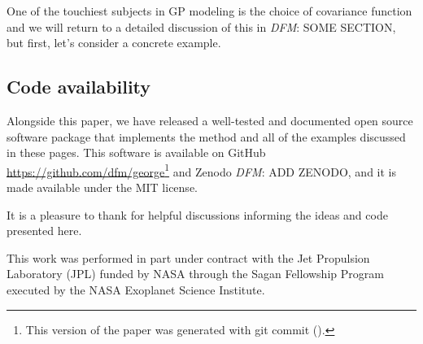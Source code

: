 \documentclass[modern, letterpaper]{aastex61}
\newcommand{\project}[1]{\textsf{#1}}
\newcommand{\todo}[3]{{\color{#2}\emph{#1}: #3}}
\newcommand{\dfmtodo}[1]{\todo{DFM}{red}{#1}}
\begin{document}
One of the touchiest subjects in GP modeling is the choice of covariance
function and we will return to a detailed discussion of this in \dfmtodo{SOME
SECTION}, but first, let's consider a concrete example.

\subsection{Code availability}

Alongside this paper, we have released a well-tested and documented open
source software package that implements the method and all of the examples
discussed in these pages.
This software is available on GitHub
\url{https://github.com/dfm/george}\footnote{This version of the paper was
generated with git commit \texttt{\githash} (\gitdate).} and Zenodo
\dfmtodo{ADD ZENODO}, and it is made available under the MIT license.

\acknowledgments
It is a pleasure to thank
for helpful discussions informing the ideas and code presented here.

This work was performed in part under contract with the Jet Propulsion
Laboratory (JPL) funded by NASA through the Sagan Fellowship Program executed
by the NASA Exoplanet Science Institute.




\software{%
}



\end{document}
